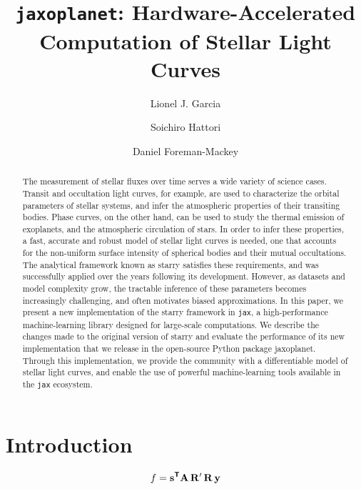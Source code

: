 \documentclass[modern]{aastex631}
\begin{document}
\title{\texttt{jaxoplanet}: Hardware-Accelerated Computation of Stellar Light Curves}

\author{Lionel J. Garcia}
\author{Soichiro Hattori}
\author{Daniel Foreman-Mackey}

\keywords{}

\begin{abstract}
    The measurement of stellar fluxes over time serves a wide variety of science cases. Transit and occultation light curves, for example, are used to characterize the orbital parameters of stellar systems, and infer the atmospheric properties of their transiting bodies. Phase curves, on the other hand, can be used to study the thermal emission of exoplanets, and the atmospheric circulation of stars. In order to infer these properties, a fast, accurate and robust model of stellar light curves is needed, one that accounts for the non-uniform surface intensity of spherical bodies and their mutual occultations. The analytical framework known as \textsf{starry} satisfies these requirements, and was successfully applied over the years following its development. However, as datasets and model complexity grow, the tractable inference of these parameters becomes increasingly challenging, and often motivates biased approximations. In this paper, we present a new implementation of the \textsf{starry} framework in \texttt{jax}, a high-performance machine-learning library designed for large-scale computations. We describe the changes made to the original version of \textsf{starry} and evaluate the performance of its new implementation that we release in the open-source Python package \textsf{jaxoplanet}. Through this implementation, we provide the community with a differentiable model of stellar light curves, and enable the use of powerful machine-learning tools available in the \texttt{jax} ecosystem. \gitlink{}

\end{abstract}

\section*{Introduction}

\begin{equation}\label{eq:starry}
    f = \bvec{s}^{\boldsymbol{\mathsf{T}}} \bvec{A} \, \bvec{R'} \, \bvec{R} \, \bvec{y}
\end{equation}
\end{document}
